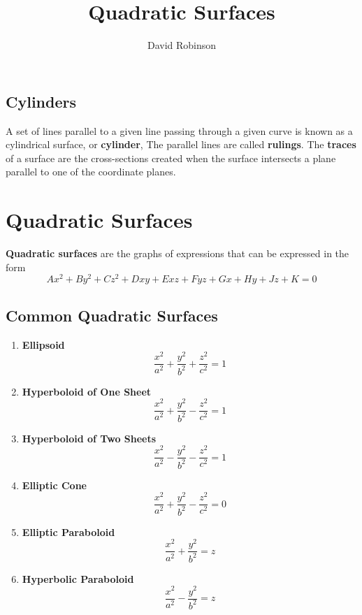 \documentclass{article}
\title{Quadratic Surfaces}
\author{David Robinson}
\date{}
\begin{document}
\maketitle

\subsection*{Cylinders}

A set of lines parallel to a given line passing through a given curve is known as a cylindrical surface, or \textbf{cylinder}, The parallel lines are called \textbf{rulings}. The \textbf{traces} of a surface are the cross-sections created when the surface intersects a plane parallel to one of the coordinate planes.

\section*{Quadratic Surfaces}

\textbf{Quadratic surfaces} are the graphs of expressions that can be expressed in the form
\[Ax^2 + By^2 + Cz^2 + Dxy + Exz + Fyz + Gx + Hy + Jz + K = 0\]

\subsection*{Common Quadratic Surfaces}

\begin{enumerate}
    \item \textbf{Ellipsoid}
    \[\frac{x^2}{a^2} + \frac{y^2}{b^2} + \frac{z^2}{c^2} = 1\]
    \item \textbf{Hyperboloid of One Sheet}
    \[\frac{x^2}{a^2} + \frac{y^2}{b^2} - \frac{z^2}{c^2} = 1\]
    \item \textbf{Hyperboloid of Two Sheets}
    \[\frac{x^2}{a^2} - \frac{y^2}{b^2} - \frac{z^2}{c^2} = 1\]
    \item \textbf{Elliptic Cone}
    \[\frac{x^2}{a^2} + \frac{y^2}{b^2} - \frac{z^2}{c^2} = 0\]
    \item \textbf{Elliptic Paraboloid}
    \[\frac{x^2}{a^2} + \frac{y^2}{b^2} = z\]
    \item \textbf{Hyperbolic Paraboloid}
    \[\frac{x^2}{a^2} - \frac{y^2}{b^2} = z\]
\end{enumerate}
\end{document}
